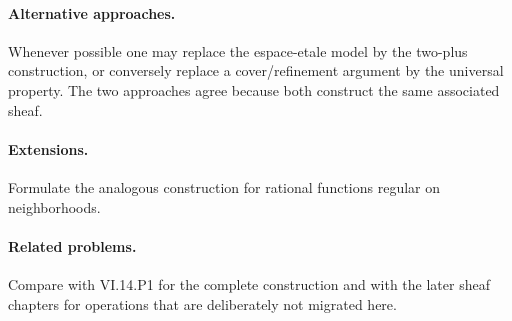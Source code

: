 \paragraph{Alternative approaches.}
Whenever possible one may replace the espace-etale model by the two-plus construction, or conversely replace a cover/refinement argument by the universal property.  The two approaches agree because both construct the same associated sheaf.

\paragraph{Extensions.}
Formulate the analogous construction for rational functions regular on neighborhoods.

\paragraph{Related problems.}
Compare with VI.14.P1 for the complete construction and with the later sheaf chapters for operations that are deliberately not migrated here.
\fi
